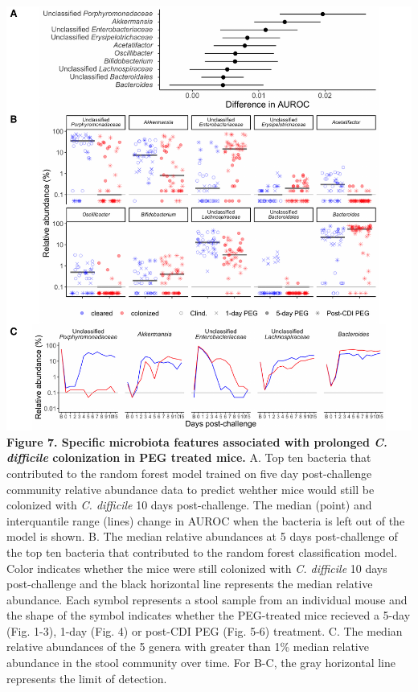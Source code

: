 \documentclass[
  11pt,
]{article}
\begin{document}
\newpage

\includegraphics{figure_7.pdf} \textbf{Figure 7. Specific microbiota
features associated with prolonged \emph{C. difficile} colonization in
PEG treated mice.} A. Top ten bacteria that contributed to the random
forest model trained on five day post-challenge community relative
abundance data to predict wehther mice would still be colonized with
\emph{C. difficile} 10 days post-challenge. The median (point) and
interquantile range (lines) change in AUROC when the bacteria is left
out of the model is shown. B. The median relative abundances at 5 days
post-challenge of the top ten bacteria that contributed to the random
forest classification model. Color indicates whether the mice were still
colonized with \emph{C. difficile} 10 days post-challenge and the black
horizontal line represents the median relative abundance. Each symbol
represents a stool sample from an individual mouse and the shape of the
symbol indicates whether the PEG-treated mice recieved a 5-day (Fig.
1-3), 1-day (Fig. 4) or post-CDI PEG (Fig. 5-6) treatment. C. The median
relative abundances of the 5 genera with greater than 1\% median
relative abundance in the stool community over time. For B-C, the gray
horizontal line represents the limit of detection. \newpage
\end{document}
